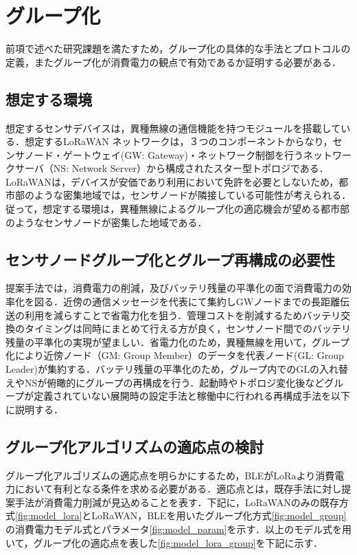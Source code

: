 \section{グループ化}
前項で述べた研究課題を満たすため，グループ化の具体的な手法とプロトコルの定義，またグループ化が消費電力の観点で有効であるか証明する必要がある．

\subsection{想定する環境}
想定するセンサデバイスは，異種無線の通信機能を持つモジュールを搭載している．想定するLoRaWAN ネットワークは，３つのコンポーネントからなり，センサノード・ゲートウェイ(GW: Gateway)・ネットワーク制御を行うネットワークサーバ（NS: Network Server）から構成されたスター型トポロジである．LoRaWANは，デバイスが安価であり利用において免許を必要としないため，都市部のような密集地域では，センサノードが隣接している可能性が考えられる．従って，想定する環境は，異種無線によるグループ化の適応機会が望める都市部のようなセンサノードが密集した地域である．

\subsection{センサノードグループ化とグループ再構成の必要性}
提案手法では，消費電力の削減，及びバッテリ残量の平準化の面で消費電力の効率化を図る．近傍の通信メッセージを代表にて集約しGWノードまでの長距離伝送の利用を減らすことで省電力化を狙う．管理コストを削減するためバッテリ交換のタイミングは同時にまとめて行える方が良く，センサノード間でのバッテリ残量の平準化の実現が望ましい．省電力化のため，異種無線を用いて，グループ化により近傍ノード（GM: Group Member）のデータを代表ノード(GL: Group Leader)が集約する．バッテリ残量の平準化のため，グループ内でのGLの入れ替えやNSが俯瞰的にグループの再構成を行う．起動時やトポロジ変化後などグループが定義されていない展開時の設定手法と稼働中に行われる再構成手法を以下に説明する．

\subsection{グループ化アルゴリズムの適応点の検討}
グループ化アルゴリズムの適応点を明らかにするため，BLEがLoRaより消費電力において有利となる条件を求める必要がある．適応点とは，既存手法に対し提案手法が消費電力削減が見込めることを表す．下記に，LoRaWANのみの既存方式\ref{fig:model_lora}とLoRaWAN，BLEを用いたグループ化方式\ref{fig:model_group}の消費電力モデル式とパラメータ\ref{fig:model_param}を示す．以上のモデル式を用いて，グループ化の適応点を表した\ref{fig:model_lora_group}を下記に示す．

